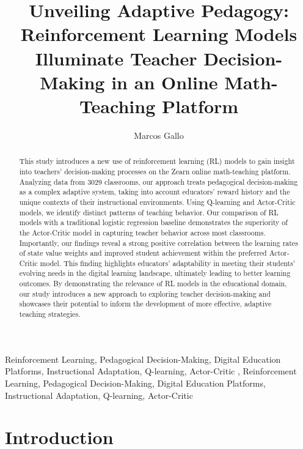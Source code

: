 \documentclass[
  number,
  preprint,
  3p,
  onecolumn]{elsarticle}
\begin{document}
\begin{frontmatter}
\title{Unveiling Adaptive Pedagogy: Reinforcement Learning Models
Illuminate Teacher Decision-Making in an Online Math-Teaching Platform}
\author[]{Marcos Gallo%
%
}




        
\begin{abstract}
This study introduces a new use of reinforcement learning (RL) models to
gain insight into teachers' decision-making processes on the Zearn
online math-teaching platform. Analyzing data from 3029 classrooms, our
approach treats pedagogical decision-making as a complex adaptive
system, taking into account educators' reward history and the unique
contexts of their instructional environments. Using Q-learning and
Actor-Critic models, we identify distinct patterns of teaching behavior.
Our comparison of RL models with a traditional logistic regression
baseline demonstrates the superiority of the Actor-Critic model in
capturing teacher behavior across most classrooms. Importantly, our
findings reveal a strong positive correlation between the learning rates
of state value weights and improved student achievement within the
preferred Actor-Critic model. This finding highlights educators'
adaptability in meeting their students' evolving needs in the digital
learning landscape, ultimately leading to better learning outcomes. By
demonstrating the relevance of RL models in the educational domain, our
study introduces a new approach to exploring teacher decision-making and
showcases their potential to inform the development of more effective,
adaptive teaching strategies.
\end{abstract}





\begin{keyword}
    Reinforcement Learning, Pedagogical Decision-Making, Digital
Education Platforms, Instructional Adaptation, Q-learning,
Actor-Critic \sep 
    Reinforcement Learning, Pedagogical Decision-Making, Digital
Education Platforms, Instructional Adaptation, Q-learning, Actor-Critic
\end{keyword}
\end{frontmatter}
    
\section{Introduction}\label{introduction}
\end{document}
